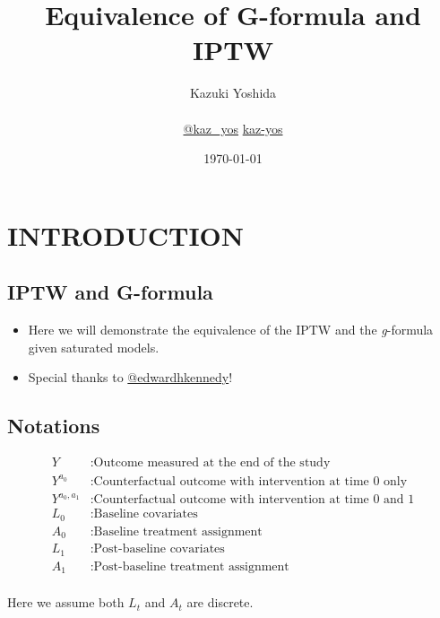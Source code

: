 \documentclass[dvipdfmx,10pt]{article}
\author{Kazuki Yoshida \\ \\ \faTwitter \href{https://twitter.com/kaz\_yos}{@kaz\_yos} \faGithub \href{https://github.com/kaz-yos/}{kaz-yos}}
\date{\today\\}
\title{Equivalence of G-formula and IPTW}
\begin{document}
\maketitle
\sloppy
\section{INTRODUCTION}
\label{sec:org2c6a77f}
\subsection{IPTW and G-formula}
\label{sec:org504c3f4}
\begin{itemize}
\item Here we will demonstrate the equivalence of the IPTW \cite{robinsMarginalStructuralModels2000} and the \emph{g}-formula \cite{robinsNewApproachCausal1986} given saturated models.
\item Special thanks to \href{https://twitter.com/edwardhkennedy/status/1119305663564472320}{@edwardhkennedy}!
\end{itemize}

\subsection{Notations}
\label{sec:org6ed8118}
\begin{align*}
  Y &: \text{Outcome measured at the end of the study}\\
  Y^{a_{0}} &: \text{Counterfactual outcome with intervention at time 0 only}\\
  Y^{a_{0},a_{1}} &: \text{Counterfactual outcome with intervention at time 0 and 1}\\
  L_{0} &: \text{Baseline covariates}\\
  A_{0} &: \text{Baseline treatment assignment}\\
  L_{1} &: \text{Post-baseline covariates}\\
  A_{1} &: \text{Post-baseline treatment assignment}\\
\end{align*}

Here we assume both \(L_{t}\) and \(A_{t}\) are discrete.
\end{document}
